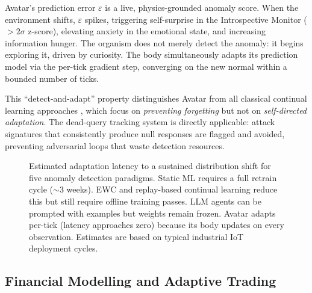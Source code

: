 \documentclass[12pt,a4paper]{article}
\begin{document}
Avatar's prediction error $\varepsilon$ is a live, physics-grounded anomaly score.
When the environment shifts, $\varepsilon$ spikes, triggering self-surprise in the
Introspective Monitor ($> 2\sigma$ z-score), elevating anxiety in the emotional state,
and increasing information hunger. The organism does not merely detect the anomaly: it
begins exploring it, driven by curiosity. The body simultaneously adapts its prediction
model via the per-tick gradient step, converging on the new normal within a bounded
number of ticks.

This ``detect-and-adapt'' property distinguishes Avatar from all classical continual
learning approaches \cite{kirkpatrick2017overcoming, zenke2017continual}, which focus on
\emph{preventing forgetting} but not on \emph{self-directed adaptation}. The dead-query
tracking system is directly applicable: attack signatures that consistently produce null
responses are flagged and avoided, preventing adversarial loops that waste detection
resources.

\begin{figure}[H]
\centering
{}
\caption{Estimated adaptation latency to a sustained distribution shift for five anomaly
detection paradigms. Static ML requires a full retrain cycle ($\sim$3 weeks). EWC and
replay-based continual learning reduce this but still require offline training passes.
LLM agents can be prompted with examples but weights remain frozen. Avatar adapts
per-tick (latency approaches zero) because its body updates on every observation.
Estimates are based on typical industrial IoT deployment cycles.}
\label{fig:anomaly}
\end{figure}

\subsection{Financial Modelling and Adaptive Trading}
\end{document}

